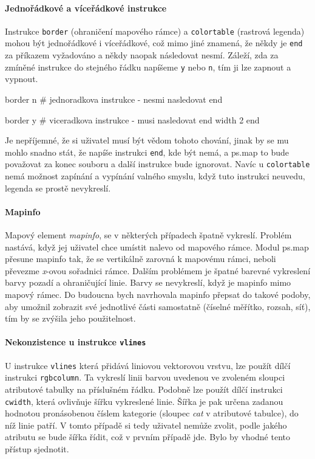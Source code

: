 \documentclass[a4paper,12pt,draft]{article}
\newcommand{\instr}[1]{\lstinline[style=psmapInline]|#1|}
\begin{document}
{\paragraph*{Jednořádkové a víceřádkové instrukce}
\label{sec:psmap:singleline}
Instrukce \instr{border} (ohraničení mapového rámce) a \instr{colortable}
(rastrová legenda) mohou být jednořádkové i víceřádkové, což mimo
jiné znamená, že někdy je \instr{end} za příkazem vyžadováno a někdy
naopak následovat nesmí. Záleží, zda za zmíněné instrukce do stejného
řádku napíšeme \instr{y} nebo \instr{n}, tím ji lze zapnout a vypnout.
\begin{psmap}
border n    # jednoradkova instrukce - nesmi nasledovat end

border y    # viceradkova instrukce - musi nasledovat end
   width 2
end
\end{psmap}
Je nepříjemné, že si uživatel musí být vědom tohoto chování,
jinak by se mu mohlo snadno stát, že napíše instrukci \instr{end}, kde
být nemá, a ps.map to bude považovat za konec souboru a další
instrukce bude ignorovat.
Navíc u \instr{colortable} nemá možnost zapínání a vypínání valného
smyslu, když tuto instrukci neuvedu, legenda se prostě nevykreslí.

\paragraph*{Mapinfo}
\label{sec:psmap:mapinfo}
Mapový element \emph{mapinfo}, se v některých případech špatně
vykreslí. Problém nastává, když jej uživatel chce umístit nalevo
od mapového rámce. Modul ps.map přesune mapinfo tak, že se
vertikálně zarovná k mapovému rámci, neboli převezme \emph{x}-ovou
sořadnici rámce. Dalším problémem je špatné barevné vykreslení barvy
pozadí a ohraničující linie. Barvy se nevykreslí, když je mapinfo
mimo mapový rámec.
Do budoucna bych navrhovala mapinfo přepsat do takové podoby, aby umožnil
zobrazit své jednotlivé části samostatně (číselné měřítko, rozsah, síť), tím
by se zvýšila jeho použitelnost.

\paragraph*{Nekonzistence u instrukce \instr{vlines}}
\label{sec:psmap:vlines}
U instrukce \instr{vlines} která přidává liniovou vektorovou vrstvu,
lze použít dílčí instrukci \instr{rgbcolumn}. Ta vykreslí   linii
barvou uvedenou ve zvoleném sloupci atributové tabulky na příslušném
řádku. Podobně lze použít dílčí instrukci \instr{cwidth}, která
ovlivňuje šířku vykreslené linie. Šířka je pak určena zadanou hodnotou
pronásobenou číslem kategorie (sloupec \emph{cat} v atributové tabulce),
do níž linie patří. V tomto případě si tedy uživatel nemůže zvolit,
podle jakého atributu se bude šířka řídit, což v prvním případě
jde. Bylo by vhodné tento přístup sjednotit.

}
\end{document}
